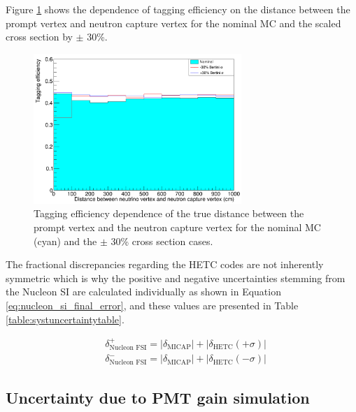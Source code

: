 Figure \ref{fig:HETC_taggeff_syst} shows the dependence of tagging efficiency on the distance between the prompt vertex and neutron capture vertex for the nominal MC and the scaled cross section by $\pm$ 30\%. 



\begin{figure}[!htb]
\centering
    \includegraphics[width=0.7\textwidth]{Figures/hetc_han_syst.PNG}
\caption{Tagging efficiency dependence of the true distance between the prompt vertex and the neutron capture vertex for the nominal MC (cyan) and the $\pm$ 30\% cross section cases.}
\label{fig:HETC_taggeff_syst}
\end{figure}

The fractional discrepancies regarding the HETC codes are not inherently symmetric which is why the positive and negative uncertainties stemming from the Nucleon SI are calculated individually as shown in Equation \ref{eq:nucleon_si_final_error}, and these values are presented in Table \ref{table:systuncertaintytable}.

\begin{equation}
    \begin{aligned}
    & \delta_{\text{Nucleon FSI}}^{+}=\left|\delta_{\text{MICAP}}\right|+\left|\delta_{\text {HETC}}(+\sigma)\right| \\
    & \delta_{\text{Nucleon FSI}}^{-}=\left|\delta_{\text {MICAP}}\right|+\left|\delta_{\text {HETC}}(-\sigma)\right|
    \end{aligned}
    \label{eq:nucleon_si_final_error}
\end{equation}


\subsection{Uncertainty due to PMT gain simulation}

